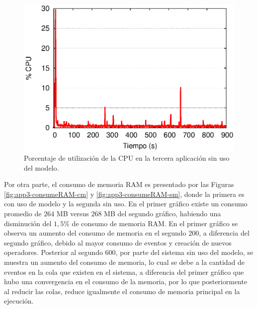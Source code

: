\begin{figure}[!ht]
\centering
    \includegraphics[scale=0.75]{images/exp/app3/sm/fisical/consumeCPU.eps}
    \caption{Porcentaje de utilización de la CPU en la tercera aplicación sin uso del modelo.}
    \label{fig:app3-consumeCPU-sm}
\end{figure}


Por otra parte, el consumo de memoria RAM es presentado por las Figuras \ref{fig:app3-consumeRAM-cm} y \ref{fig:app3-consumeRAM-sm}, donde la primera es con uso de modelo y la segunda sin uso. En el primer gráfico existe un consumo promedio de $264$ MB versus $268$ MB del segundo gráfico, habiendo una disminución del $1,5\%$ de consumo de memoria RAM. En el primer gráfico se observa un aumento del consumo de memoria en el segundo 200, a diferencia del segundo gráfico, debido al mayor consumo de eventos y creación de nuevos operadores. Posterior al segundo 600, por parte del sistema sin uso del modelo, se muestra un aumento del consumo de memoria, lo cual se debe a la cantidad de eventos en la cola que existen en el sistema, a diferencia del primer gráfico que hubo una convergencia en el consumo de la memoria, por lo que posteriormente al reducir las colas, reduce igualmente el consumo de memoria principal en la ejecución.

